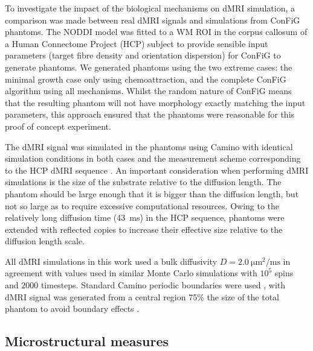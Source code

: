 To investigate the impact of the biological mechanisms on dMRI simulation, a comparison was made between real dMRI signals and simulations from ConFiG phantoms. The NODDI model \cite{Zhang2012} was fitted to a WM ROI in the corpus callosum of a Human Connectome Project (HCP) \cite{VanEssen2012} subject to provide sensible input parameters (target fibre density and orientation dispersion) for ConFiG to generate phantoms. We generated phantoms using the two extreme cases: the minimal growth case only using chemoattraction, and the complete ConFiG algorithm using all mechanisms. Whilst the random nature of ConFiG means that the resulting phantom will not have morphology exactly matching the input parameters, this approach ensured that the phantoms were reasonable for this proof of concept experiment.

The dMRI signal was simulated in the phantoms using Camino \cite{Cook2006,Hall2009} with identical simulation conditions in both cases and the measurement scheme corresponding to the HCP dMRI sequence \cite{Sotiropoulos2013a}. An important consideration when performing dMRI simulations is the size of the substrate relative to the diffusion length. The phantom should be large enough that it is bigger than the diffusion length, but not so large as to require excessive computational resources. Owing to the relatively long diffusion time (\SI{43}{\milli\second}) in the HCP sequence, phantoms were extended with reflected copies \cite{Lee2019a,Fieremans2018} to increase their effective size relative to the diffusion length scale.

All dMRI simulations in this work used a bulk diffusivity $D=\SI{2.0}{\micro\metre\squared\per\milli\second}$ in agreement with values used in similar Monte Carlo simulations \cite{Hall2009,Nilsson2009,Rensonnet2017} with $10^5$ spins and $2000$ timesteps. Standard Camino periodic boundaries were used \cite{Hall2009}, with dMRI signal was generated from a central region 75\% the size of the total phantom to avoid boundary effects \cite{Panagiotaki2010}.

\subsection{Microstructural measures}
\label{sec:config_micr_meas}

